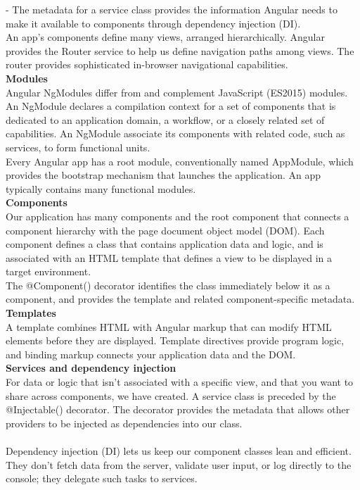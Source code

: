 \documentclass{scrartcl}
\begin{document}
 - The metadata for a service class provides the information Angular needs to make it available to components through dependency injection (DI).\\

An app's components define many views, arranged hierarchically. Angular provides the Router service to help us define navigation paths among views. The router provides sophisticated in-browser navigational capabilities.\\

\textbf{Modules} \\
Angular NgModules differ from and complement JavaScript (ES2015) modules. An NgModule declares a compilation context for a set of components that is dedicated to an application domain, a workflow, or a closely related set of capabilities. An NgModule associate its components with related code, such as services, to form functional units.\\

Every Angular app has a root module, conventionally named AppModule, which provides the bootstrap mechanism that launches the application. An app typically contains many functional modules.\\


\textbf{Components}\\
Our application has many components and the root component that connects a component hierarchy with the page document object model (DOM). Each component defines a class that contains application data and logic, and is associated with an HTML template that defines a view to be displayed in a target environment.\\

The @Component() decorator identifies the class immediately below it as a component, and provides the template and related component-specific metadata.\\

\textbf{Templates}\\
A template combines HTML with Angular markup that can modify HTML elements before they are displayed. Template directives provide program logic, and binding markup connects your application data and the DOM. \\

\textbf{Services and dependency injection}\\
For data or logic that isn't associated with a specific view, and that you want to share across components, we have created. A service class is preceded by the @Injectable() decorator. The decorator provides the metadata that allows other providers to be injected as dependencies into our class.\\
\\
Dependency injection (DI) lets us keep our component classes lean and efficient. They don't fetch data from the server, validate user input, or log directly to the console; they delegate such tasks to services.\\
\end{document}
